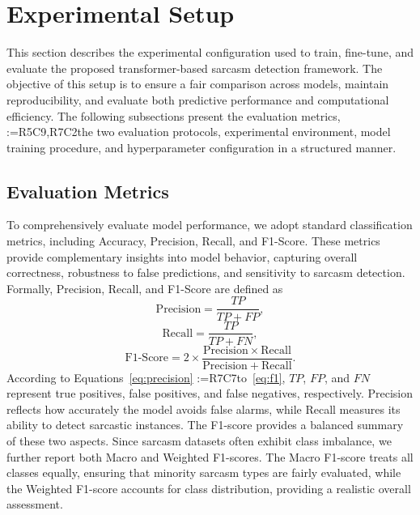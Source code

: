 \documentclass[a4paper,fleqn]{cas-sc}
\makeatletter
\newif\iftracked
\newcommand{\rv@setcolour}[1]{%
  \IfStrEq{#1}{R7C7}{\color{rvEdit}}{%
    \IfSubStr{#1}{R5}{\IfSubStr{#1}{R7}{\color{rvBoth}}{\color{rvFive}}}{\color{rvSeven}}}}
\newcommand{\rv@tag}[1]{\textsuperscript{\sffamily\bfseries\scriptsize[\StrSubstitute{#1}{,}{, }]}\,}
\newcommand{\rv@recordone}[1]{%
  \edef\rv@i{#1}%
  \ifcsdef{rv@n@\rv@i}{}{\csgdef{rv@n@\rv@i}{0}}%
  \csxdef{rv@n@\rv@i}{\the\numexpr\csuse{rv@n@\rv@i}+1\relax}%
  \begingroup\edef\@currentlabel{\rv@i}\label{rv:\rv@i:\csuse{rv@n@\rv@i}}\endgroup}
\newcommand{\rv@record}[1]{\@for\rv@id:=#1\do{\expandafter\rv@recordone\expandafter{\rv@id}}}
\DeclareRobustCommand{\rc}[2]{\rv@record{#1}\iftracked{\rv@setcolour{#1}\rv@tag{#1}#2}\else#2\fi}
\DeclareRobustCommand{\rce}[1]{\rv@record{R7C7}\iftracked{\color{rvEdit}#1}\else#1\fi}
\makeatother
\begin{document}
\section{Experimental Setup}
\label{sec:setup}

This section describes the experimental configuration used to train, fine-tune, and evaluate the proposed transformer-based sarcasm detection framework. The objective of this setup is to ensure a fair comparison across models, maintain reproducibility, and evaluate both predictive performance and computational efficiency. The following subsections present the evaluation metrics, \rc{R5C9,R7C2}{the two evaluation protocols,} experimental environment, model training procedure, and hyperparameter configuration in a structured manner.

\subsection{Evaluation Metrics}
To comprehensively evaluate model performance, we adopt standard classification metrics, including Accuracy, Precision, Recall, and F1-Score. These metrics provide complementary insights into model behavior, capturing overall correctness, robustness to false predictions, and sensitivity to sarcasm detection. Formally, Precision, Recall, and F1-Score are defined as
\begin{equation}
\mathrm{Precision} = \frac{TP}{TP+FP},
\label{eq:precision}
\end{equation}
\begin{equation}
\mathrm{Recall} = \frac{TP}{TP+FN},
\label{eq:recall}
\end{equation}
\begin{equation}
\mathrm{F1\text{-}Score} = 2 \times \frac{\mathrm{Precision}\times \mathrm{Recall}}{\mathrm{Precision}+\mathrm{Recall}}.
\label{eq:f1}
\end{equation}
According to Equations~\eqref{eq:precision} \rce{to}~\eqref{eq:f1}, $TP$, $FP$, and $FN$ represent true positives, false positives, and false negatives, respectively. Precision reflects how accurately the model avoids false alarms, while Recall measures its ability to detect sarcastic instances. The F1-score provides a balanced summary of these two aspects. Since sarcasm datasets often exhibit class imbalance, we further report both Macro and Weighted F1-scores. The Macro F1-score treats all classes equally, ensuring that minority sarcasm types are fairly evaluated, while the Weighted F1-score accounts for class distribution, providing a realistic overall assessment.
\end{document}
